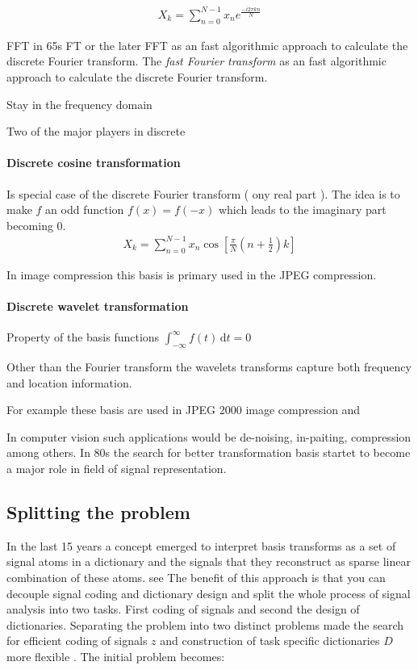 \begin{align*}
 X_k = \sum_{n=0}^{N-1}x_ne^{\frac{-i2\pi kn}{N}}
\end{align*}

FFT in 65s
FT or the later FFT as an fast algorithmic approach to calculate the discrete
Fourier transform.
The \emph{fast Fourier transform}  as an fast algorithmic approach to calculate
the discrete Fourier transform.



Stay in the frequency domain

Two of the major players in discrete 

\paragraph{Discrete cosine transformation}
Is special case of the discrete Fourier transform ( ony real part ).
The idea is to make $f$ an odd function $f(x) = f(-x) $ which leads to the
imaginary part becoming 0.
\begin{align*}
X_k = \sum_{n=0}^{N-1}x_n\cos \left[ \frac{\pi}{N} \left(
n+\frac{1}{2}\right) k\right]
\end{align*}
\Todo{}

In image compression this basis is primary used in the JPEG compression.


\paragraph{Discrete wavelet transformation}

Property of the basis functions
$\int_{-\infty}^{\infty} \! f(t) \, \mathrm{d}t = 0$

\Todo{}
Other than the Fourier transform the wavelets transforms capture both frequency
and location information.

For example these basis are used in JPEG 2000 image compression and 

In computer vision such applications would be de-noising, in-paiting,
compression among others. In 80s the search for better transformation basis
startet to become a major role in field of signal representation.\cite{}


\subsection{Splitting the problem}
\cite{Rubinstein2010}
In the last 15 years a concept emerged to interpret basis transforms as a set of
signal atoms in a dictionary and the signals that they reconstruct as sparse
linear combination of these atoms. see\cite{Olshausen1996,Mallat1993} The
benefit of this approach is that you can decouple signal coding and dictionary
design and split the whole process of signal analysis into two tasks. First
coding of signals and second the design of dictionaries. Separating the problem
into two distinct problems made the search for efficient coding of signals $z$
and construction of task specific dictionaries $D$ more flexible \cite{?}. The
initial problem becomes:

